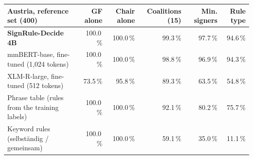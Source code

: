 \begin{tabular}{lrrrrr}
\toprule
Austria, reference set (400) & GF alone & Chair alone & Coalitions (15) & Min. signers & Rule type \\
\midrule
\textbf{SignRule-Decide 4B} & 100.0\,\% & 100.0\,\% & 99.3\,\% & 97.7\,\% & 94.6\,\% \\
mmBERT-base, fine-tuned (1,024 tokens) & 100.0\,\% & 100.0\,\% & 98.8\,\% & 96.9\,\% & 94.3\,\% \\
XLM-R-large, fine-tuned (512 tokens) & 73.5\,\% & 95.8\,\% & 89.3\,\% & 63.5\,\% & 54.8\,\% \\
Phrase table (rules from the training labels) & 100.0\,\% & 100.0\,\% & 92.1\,\% & 80.2\,\% & 75.7\,\% \\
Keyword rules (selbständig / gemeinsam) & 100.0\,\% & 100.0\,\% & 59.1\,\% & 35.0\,\% & 11.1\,\% \\
\bottomrule
\end{tabular}

